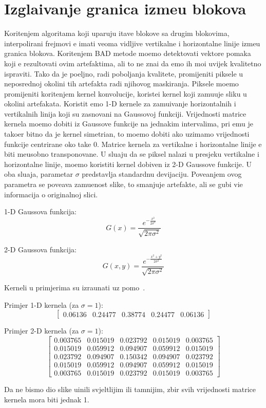 \section{Izgla\dj ivanje granica izme\dj u blokova}
Kori\sh tenjem algoritama koji uparuju \ch itave blokove sa drugim blokovima, interpolirani frejmovi \cj e imati veoma vidljive vertikalne i horizontalne linije izme\dj u granica blokova. Kori\sh tenjem BAD metode mo\zh emo detektovati vektore
pomaka koji \cj e rezultovati ovim artefaktima, ali to ne zna\ch i da \cj emo ih mo\cj i uvijek kvalitetno ispraviti. Tako da je po\zh eljno, radi pobolj\sh anja kvalitete, promijeniti piksele u neposrednoj okolini tih artefakta radi njihovog maskiranja.
Piksele mo\zh emo promijeniti kori\sh tenjem kernel konvolucije, koriste\cj i kernel koji zamu\cj uje sliku u okolini artefakata. Koristit \cj emo 1-D kernele za zamu\cj ivanje horizontalnih i vertikalnih linija koji su zasnovani na Gaussovoj funkciji.
Vrijednosti matrice kernela mo\zh emo dobiti iz Gaussove funkcije na jednakim intervalima, pri \ch emu je tako\dj er bitno da je kernel simetri\ch an, \sh to mo\zh emo dobiti ako uzimamo vrijednosti funkcije centrirane oko ta\ch ke 0.
Matrice kernela za vertikalne i horizontalne linije \cj e biti me\dj usobno transponovane. U slu\ch aju da se piksel nalazi u presjeku vertikalne i horizontalne linije, mo\zh emo koristiti kernel dobiven iz 2-D Gaussove funkcije. U oba slu\ch aja,
parametar $\sigma$ predstavlja standardnu devijaciju. Pove\cj anjem ovog parametra se pove\cj ava zamu\cj enost slike, \sh to smanjuje artefakte, ali se gubi vi\sh e informacija o originalnoj slici.

1-D Gaussova funkcija\cite{gaussian}:
\[
G(x)=\frac{e^{-\frac{x^2}{2\sigma^2}}}{\sqrt{2\pi\sigma^2}}
\]

2-D Gaussova funkcija:
\[
G(x,y)=\frac{e^{-\frac{x^2+y^2}{2\sigma^2}}}{\sqrt{2\pi\sigma^2}}
\]

Kerneli u primjerima su izra\ch unati uz pomo\cj\ \cite{gausscalc}.

Primjer 1-D kernela (za $\sigma=1$):
\[
\begin{bmatrix}
0.06136 & 0.24477 & 0.38774 & 0.24477 & 0.06136
\end{bmatrix}
\]

Primjer 2-D kernela (za $\sigma=1$):
\[
\begin{bmatrix}
0.003765 & 0.015019 & 0.023792 & 0.015019 & 0.003765 \\
0.015019 & 0.059912 & 0.094907 & 0.059912 & 0.015019 \\
0.023792 & 0.094907 & 0.150342 & 0.094907 & 0.023792 \\
0.015019 & 0.059912 & 0.094907 & 0.059912 & 0.015019 \\
0.003765 & 0.015019 & 0.023792 & 0.015019 & 0.003765
\end{bmatrix}
\]

Da ne bismo dio slike u\ch inili svjeltlijim ili tamnijim, zbir svih vrijednosti matrice kernela mora biti jednak 1.